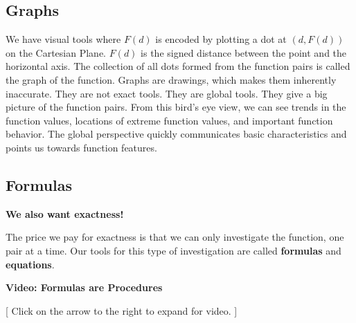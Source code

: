 \documentclass{ximera}
\begin{document}
\subsection*{Graphs}

We have visual tools where $F(d)$ is encoded by plotting a dot at $(d, F(d))$ on the Cartesian Plane.  $F(d)$ is the signed distance between the point and the horizontal axis. The collection of all dots formed from the function pairs is called the graph of the function. Graphs are drawings, which makes them inherently inaccurate.  They are not exact tools.  They are global tools.  They give a big picture of the function pairs.  From this bird's eye view, we can see trends in the function values, locations of extreme function values, and important function behavior. The global perspective quickly communicates basic characteristics and points us towards function features.












\subsection*{Formulas}
\textbf{\textcolor{red!70!black}{We also want exactness!}} 


The price we pay for exactness is that we can only investigate the function, one pair at a time.  Our tools for this type of investigation are called \textbf{formulas} and \textbf{equations}.








\begin{explanation} \textbf{\textcolor{red!75!green}{Video: Formulas are Procedures}}

[ Click on the arrow to the right to expand for video. ]
\begin{expandable} 

\begin{center}
\end{center}

\end{expandable}
\end{explanation}
\end{document}
